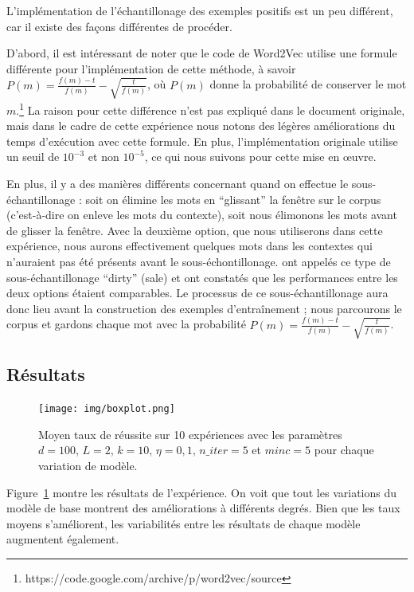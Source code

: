 \documentclass[12pt]{article}
\begin{document}
L'implémentation de l'échantillonage des exemples positifs est un peu différent, car il existe des façons différentes de procéder.

D'abord, il est intéressant de noter que le code de Word2Vec utilise une formule différente pour l'implémentation de cette méthode, à savoir $ P(m) = \frac{f(m)-t}{f(m)} - \sqrt{\frac{t}{f(m)}} $, où $P(m)$ donne la probabilité de conserver le mot $m$.\footnote{https://code.google.com/archive/p/word2vec/source} La raison pour cette différence n'est pas expliqué dans le document originale, mais dans le cadre de cette expérience nous notons des légères améliorations du temps d'exécution avec cette formule. En plus, l'implémentation originale utilise un seuil de $10^{-3}$ et non $10^{-5}$, ce qui nous suivons pour cette mise en œuvre.

En plus, il y a des manières différents concernant quand on effectue le sous-échantillonage : soit on élimine les mots en ``glissant'' la fenêtre sur le corpus (c'est-à-dire on enleve les mots du contexte), soit nous élimonons les mots avant de glisser la fenêtre. Avec la deuxième option, que nous utiliserons dans cette expérience, nous aurons effectivement quelques mots dans les contextes qui n'auraient pas été présents avant le sous-échontillonage. \cite{levy2015improving} ont appelés ce type de sous-échantillonage ``dirty'' (sale) et ont constatés que les performances entre les deux options étaient comparables. Le processus de ce sous-échantillonage aura donc lieu avant la construction des exemples d'entraînement ; nous parcourons le corpus et gardons chaque mot avec la probabilité $ P(m) = \frac{f(m)-t}{f(m)} - \sqrt{\frac{t}{f(m)}} $.

\subsection{Résultats} \label{résultats-1}

\begin{figure}[htpb]
    \centering
    \texttt{[image: img/boxplot.png]}
    \caption{Moyen taux de réussite sur 10 expériences avec les paramètres $d=100$, $L=2$, $k=10$, $\eta=0{,}1$, $n\_ iter=5$ et $minc=5$ pour chaque variation de modèle.}
    \label{fig:boxplot}
\end{figure}

Figure~\ref{fig:boxplot} montre les résultats de l'expérience. On voit que tout les variations du modèle de base montrent des améliorations à différents degrés. Bien que les taux moyens s'améliorent, les variabilités entre les résultats de chaque modèle augmentent également. 
\end{document}
